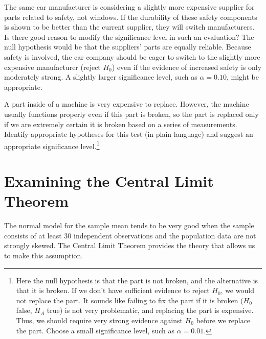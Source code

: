 \begin{example}{The same car manufacturer is considering a slightly more expensive supplier for parts related to safety, not windows. If the durability of these safety components is shown to be better than the current supplier, they will switch manufacturers. Is there good reason to modify the significance level in such an evaluation?}
The null hypothesis would be that the suppliers' parts are equally reliable. Because safety is involved, the car company should be eager to switch to the slightly more expensive manufacturer (reject $H_0$) even if the evidence of increased safety is only moderately strong. A slightly larger significance level, such as $\alpha=0.10$, might be appropriate.
\end{example}

\begin{exercise}
A part inside of a machine is very expensive to replace. However, the machine usually functions properly even if this part is broken, so the part is replaced only if we are extremely certain it is broken based on a series of measurements. Identify appropriate hypotheses for this test (in plain language) and suggest an appropriate significance level.\footnote{Here the null hypothesis is that the part is not broken, and the alternative is that it is broken. If we don't have sufficient evidence to reject $H_0$, we would not replace the part. It sounds like failing to fix the part if it is broken ($H_0$ false, $H_A$ true) is not very problematic, and replacing the part is expensive. Thus, we should require very strong evidence against $H_0$ before we replace the part. Choose a small significance level, such as $\alpha=0.01$.}
\end{exercise}



\section{Examining the Central Limit Theorem}
\label{cltSection}


The normal model for the sample mean tends to be very good when the sample consists of at least 30 independent observations and the population data are not strongly skewed. The Central Limit Theorem provides the theory that allows us to make this assumption.

